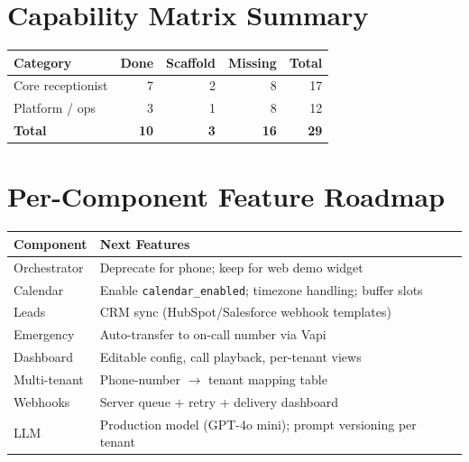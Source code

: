 \documentclass[11pt,a4paper]{article}
\begin{document}
\section{Capability Matrix Summary}

\begin{center}
\small
\begin{tabular}{@{}lrrrr@{}}
\toprule
\textbf{Category} & \textbf{Done} & \textbf{Scaffold} & \textbf{Missing} & \textbf{Total} \\
\midrule
Core receptionist & 7 & 2 & 8 & 17 \\
Platform / ops & 3 & 1 & 8 & 12 \\
\midrule
\textbf{Total} & \textbf{10} & \textbf{3} & \textbf{16} & \textbf{29} \\
\bottomrule
\end{tabular}
\end{center}

\section{Per-Component Feature Roadmap}

\begin{center}
\scriptsize
\begin{tabularx}{\textwidth}{@{}lX@{}}
\toprule
\textbf{Component} & \textbf{Next Features} \\
\midrule
Orchestrator & Deprecate for phone; keep for web demo widget \\
Calendar & Enable \texttt{calendar\_enabled}; timezone handling; buffer slots \\
Leads & CRM sync (HubSpot/Salesforce webhook templates) \\
Emergency & Auto-transfer to on-call number via Vapi \\
Dashboard & Editable config, call playback, per-tenant views \\
Multi-tenant & Phone-number $\rightarrow$ tenant mapping table \\
Webhooks & Server queue + retry + delivery dashboard \\
LLM & Production model (GPT-4o mini); prompt versioning per tenant \\
\bottomrule
\end{tabularx}
\end{center}
\end{document}
